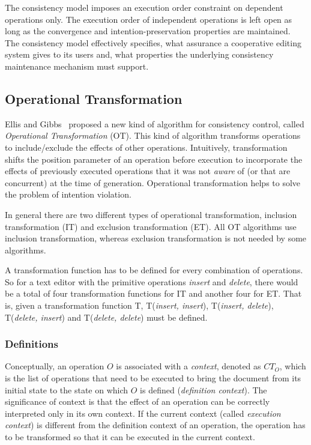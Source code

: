 \documentclass[11pt,a4paper]{article}
\begin{document}
The consistency model imposes an execution order constraint on dependent operations only. The execution order of independent operations is left open as long as the convergence and intention-preservation properties are maintained. The consistency model effectively specifies, what assurance a cooperative editing system gives to its users and, what properties the underlying consistency maintenance mechanism must support.



\subsection{Operational Transformation}
\label{sect:ot}
{Ellis and Gibbs}~\cite{ellis} proposed a new kind of algorithm for consistency control, called \emph{Operational Transformation} (OT).  This kind of algorithm transforms operations to include/exclude the effects of other operations. Intuitively, transformation shifts the position parameter of an operation before execution to incorporate the effects of previously executed operations that it was not \emph{aware} of (or that are concurrent) at the time of generation. Operational transformation helps to solve the problem of intention violation.

In general there are two different types of operational transformation, inclusion transformation (IT) and exclusion transformation (ET). All OT algorithms use inclusion transformation, whereas exclusion transformation is not needed by some algorithms.

A transformation function has to be defined for every combination of operations. So for a text editor with the primitive operations \emph{insert} and \emph{delete}, there would be a total of four transformation functions for IT and another four for ET. That is, given a transformation function T, T(\emph{insert, insert}), T(\emph{insert, delete}), T(\emph{delete, insert}) and T(\emph{delete, delete}) must be defined.

\subsubsection{Definitions}
\label{definitions}
Conceptually, an operation $O$ is associated with a \emph{context}, denoted as $CT_{O}$, which is the list of operations that need to be executed to bring the document from its initial state to the state on which $O$ is defined (\emph{definition context}). The significance of context is that the effect of an operation can be correctly interpreted only in its own context. If the current context (called \emph{execution context}) is different from the definition context of an operation, the operation has to be transformed so that it can be executed in the current context.
\end{document}
